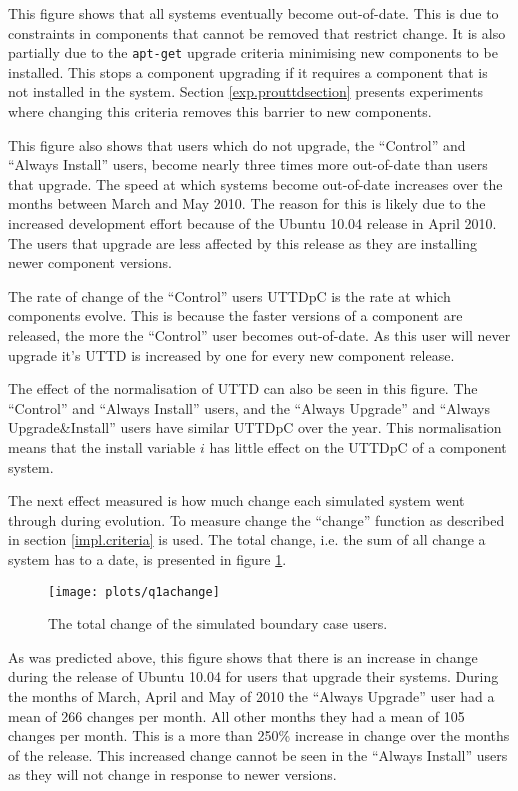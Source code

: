 This figure shows that all systems eventually become out-of-date.
This is due to constraints in components that cannot be removed that restrict change. 
It is also partially due to the \texttt{apt-get} upgrade criteria minimising new components to be installed.
This stops a component upgrading if it requires a component that is not installed in the system.
Section \ref{exp.prouttdsection} presents experiments where changing this criteria removes this barrier to new components. 

This figure also shows that users which do not upgrade, the ``Control'' and ``Always Install'' users, become nearly three times more out-of-date than users that upgrade.
The speed at which systems become out-of-date increases over the months between March and May 2010.
The reason for this is likely due to the increased development effort because of the Ubuntu 10.04 release in April 2010.
The users that upgrade are less affected by this release as they are installing newer component versions.

The rate of change of the ``Control'' users UTTDpC is the rate at which components evolve.
This is because the faster versions of a component are released, the more the ``Control'' user becomes out-of-date.
As this user will never upgrade it's UTTD is increased by one for every new component release.

The effect of the normalisation of UTTD can also be seen in this figure.
The ``Control'' and ``Always Install'' users, and the ``Always Upgrade'' and ``Always Upgrade\&Install'' users have similar UTTDpC over the year.
This normalisation means that the install variable $i$ has little effect on the UTTDpC of a component system.


The next effect measured is how much change each simulated system went through during evolution.
To measure change the ``change'' function as described in section \ref{impl.criteria} is used.
The total change, i.e. the sum of all change a system has to a date, is presented in figure \ref{exp.q1achange}.
\begin{figure}[htp]
\begin{center}
  \texttt{[image: plots/q1achange]}
  \caption{The total change of the simulated boundary case users.}
  \label{exp.q1achange}
\end{center}
\end{figure}

As was predicted above, this figure shows that there is an increase in change during the release of Ubuntu 10.04 for users that upgrade their systems.
During the months of March, April and May of 2010 the ``Always Upgrade'' user had a mean of 266 changes per month.
All other months they had a mean of 105 changes per month.
This is a more than 250\% increase in change over the months of the release.
This increased change cannot be seen in the ``Always Install'' users as they will not change in response to newer versions.

